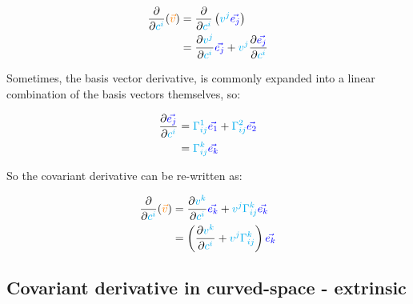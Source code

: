 \begin{align*}
    \frac{\partial}{\partial \begingroup\color{cyan}c^i\endgroup} (\begingroup\color{orange}\vec{v}\endgroup) &= 
    \frac{\partial}{\partial \begingroup\color{cyan}c^i\endgroup} \left(\begingroup\color{cyan}v^j\endgroup \begingroup\color{blue}\vec{e_j}\endgroup\right)\\
    &= \frac{\partial \begingroup\color{cyan}v^j\endgroup}{\partial \begingroup\color{cyan}c^i\endgroup} \begingroup\color{blue}\vec{e_j}\endgroup
    + \begingroup\color{cyan}v^j\endgroup \frac{\partial \begingroup\color{blue}\vec{e_j}\endgroup}{\partial \begingroup\color{cyan}c^i\endgroup}
\end{align*}

Sometimes, the basis vector derivative, is commonly expanded into a linear combination of the basis 
vectors themselves, so:

\begin{align*}
    \frac{\partial \begingroup\color{blue}\vec{e_j}\endgroup}{\partial \begingroup\color{cyan}c^i\endgroup} &= 
    \begingroup\color{cyan}\Gamma^1_{ij}\endgroup \begingroup\color{blue}\vec{e_1}\endgroup + \begingroup\color{cyan}\Gamma^2_{ij}\endgroup \begingroup\color{blue}\vec{e_2}\endgroup\\
    &= \begingroup\color{cyan}\Gamma^k_{ij}\endgroup \begingroup\color{blue}\vec{e_k}\endgroup
\end{align*}

So the covariant derivative can be re-written as:

\begin{align*}
    \frac{\partial}{\partial \begingroup\color{cyan}c^i\endgroup} (\begingroup\color{orange}\vec{v}\endgroup) &= 
    \frac{\partial \begingroup\color{cyan}v^k\endgroup}{\partial \begingroup\color{cyan}c^i\endgroup} \begingroup\color{blue}\vec{e_k}\endgroup
    + \begingroup\color{cyan}v^j\endgroup \begingroup\color{cyan}\Gamma^k_{ij}\endgroup \begingroup\color{blue}\vec{e_k}\endgroup\\
    &= \left(\frac{\partial \begingroup\color{cyan}v^k\endgroup}{\partial \begingroup\color{cyan}c^i\endgroup} + \begingroup\color{cyan}v^j\endgroup \begingroup\color{cyan}\Gamma^k_{ij}\endgroup\right)\begingroup\color{blue}\vec{e_k}\endgroup
\end{align*}

\subsection{Covariant derivative in curved-space - extrinsic}

